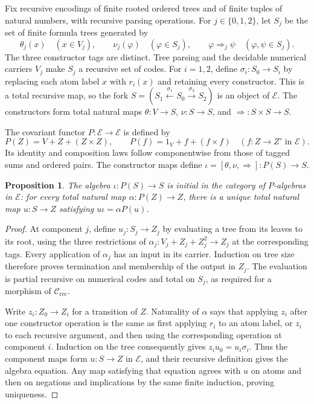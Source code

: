 \documentclass[11pt]{article}
\newtheorem{proposition}[theorem]{Proposition}
\begin{document}
Fix recursive encodings of finite rooted ordered trees and of finite
tuples of natural numbers, with recursive parsing operations. For
$j\in\{0,1,2\}$, let $S_j$ be the set of finite formula trees
generated by
\[
 \theta_j(x)\quad(x\in V_j),\qquad
 \nu_j(\varphi)\quad(\varphi\in S_j),\qquad
 \varphi\Rightarrow_j\psi\quad(\varphi,\psi\in S_j).
\]
The three constructor tags are distinct. Tree parsing and the
decidable numerical carriers $V_j$ make $S_j$ a recursive set of
codes. For $i=1,2$, define $\sigma_i:S_0\to S_i$ by replacing
each atom label $x$ with $r_i(x)$ and retaining every constructor.
This is a total recursive map, so the fork
$S=(S_1\xleftarrow{\sigma_1}S_0\xrightarrow{\sigma_2}S_2)$
is an object of $\mathcal E$. The constructors form total natural
maps $\theta:V\to S$, $\nu:S\to S$, and
$\Rightarrow:S\times S\to S$.

The covariant functor $P:\mathcal E\to\mathcal E$ is defined by
\[
 P(Z)=V+Z+(Z\times Z),\qquad
 P(f)=1_V+f+(f\times f)
 \quad(f:Z\to Z'\text{ in }\mathcal E).
\]
Its identity and composition laws follow componentwise from those
of tagged sums and ordered pairs. The constructor maps define
$\iota=[\theta,\nu,\Rightarrow]:P(S)\to S$.

\begin{proposition}\label{prop:fork-syntax-initial}
The algebra $\iota:P(S)\to S$ is initial in the category of
$P$-algebras in $\mathcal E$: for every total natural map
$\alpha:P(Z)\to Z$, there is a unique total natural map
$u:S\to Z$ satisfying $u\iota=\alpha P(u)$.
\end{proposition}
\begin{proof}
At component $j$, define $u_j:S_j\to Z_j$ by evaluating a tree
from its leaves to its root, using the three restrictions of
$\alpha_j:V_j+Z_j+Z_j^2\to Z_j$ at the corresponding tags.
Every application of $\alpha_j$ has an input in its carrier.
Induction on tree size therefore proves termination and membership
of the output in $Z_j$. The evaluation is partial recursive on
numerical codes and total on $S_j$, as required for a morphism of
$\mathcal C_{\mathrm{rec}}$.

Write $z_i:Z_0\to Z_i$ for a transition of $Z$. Naturality of
$\alpha$ says that applying $z_i$ after one constructor operation
is the same as first applying $r_i$ to an atom label, or $z_i$
to each recursive argument, and then using the corresponding
operation at component $i$. Induction on the tree consequently
gives $z_i u_0=u_i\sigma_i$. Thus the component maps form
$u:S\to Z$ in $\mathcal E$, and their recursive definition gives
the algebra equation. Any map satisfying that equation agrees
with $u$ on atoms and then on negations and implications by the
same finite induction, proving uniqueness.
\end{proof}
\end{document}
